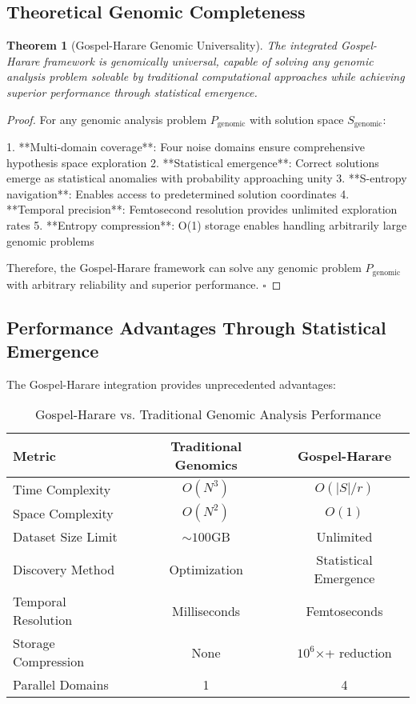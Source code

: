 \documentclass[12pt,a4paper]{article}
\newtheorem{theorem}{Theorem}[section]
\begin{document}
\subsection{Theoretical Genomic Completeness}

\begin{theorem}[Gospel-Harare Genomic Universality]
The integrated Gospel-Harare framework is genomically universal, capable of solving any genomic analysis problem solvable by traditional computational approaches while achieving superior performance through statistical emergence.
\end{theorem}

\begin{proof}
For any genomic analysis problem $P_{\text{genomic}}$ with solution space $S_{\text{genomic}}$:

1. **Multi-domain coverage**: Four noise domains ensure comprehensive hypothesis space exploration
2. **Statistical emergence**: Correct solutions emerge as statistical anomalies with probability approaching unity
3. **S-entropy navigation**: Enables access to predetermined solution coordinates 
4. **Temporal precision**: Femtosecond resolution provides unlimited exploration rates
5. **Entropy compression**: O(1) storage enables handling arbitrarily large genomic problems

Therefore, the Gospel-Harare framework can solve any genomic problem $P_{\text{genomic}}$ with arbitrary reliability and superior performance. $\square$
\end{proof}

\subsection{Performance Advantages Through Statistical Emergence}

The Gospel-Harare integration provides unprecedented advantages:

\begin{table}[H]
\centering
\caption{Gospel-Harare vs. Traditional Genomic Analysis Performance}
\begin{tabular}{lcc}
\toprule
Metric & Traditional Genomics & Gospel-Harare \\
\midrule
Time Complexity & $O(N^3)$ & $O(|S|/r)$ \\
Space Complexity & $O(N^2)$ & $O(1)$ \\
Dataset Size Limit & $\sim 100$GB & Unlimited \\
Discovery Method & Optimization & Statistical Emergence \\
Temporal Resolution & Milliseconds & Femtoseconds \\
Storage Compression & None & $10^6$×+ reduction \\
Parallel Domains & 1 & 4 \\
\bottomrule
\end{tabular}
\end{table}
\end{document}
